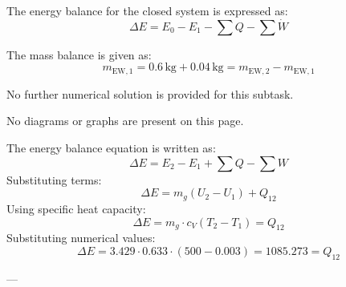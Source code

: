 The energy balance for the closed system is expressed as:  
\[
\Delta E = E_0 - E_1 - \sum Q - \sum \dot{W}
\]  

The mass balance is given as:  
\[
m_{\text{EW},1} = 0.6 \, \text{kg} + 0.04 \, \text{kg} = m_{\text{EW},2} - m_{\text{EW},1}
\]  

No further numerical solution is provided for this subtask.  

No diagrams or graphs are present on this page.

The energy balance equation is written as:  
\[
\Delta E = E_2 - E_1 + \sum Q - \sum W
\]  
Substituting terms:  
\[
\Delta E = m_g (U_2 - U_1) + Q_{12}
\]  
Using specific heat capacity:  
\[
\Delta E = m_g \cdot c_V (T_2 - T_1) = Q_{12}
\]  
Substituting numerical values:  
\[
\Delta E = 3.429 \cdot 0.633 \cdot (500 - 0.003) = 1085.273 = Q_{12}
\]  

---